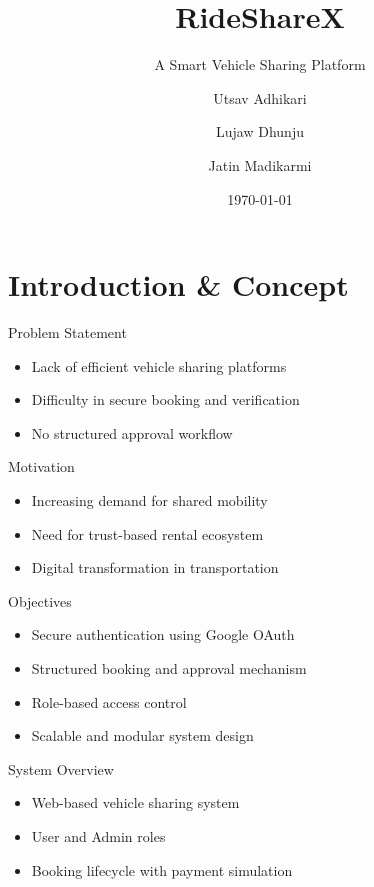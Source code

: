\documentclass[aspectratio=169]{beamer}
\title{RideShareX}
\subtitle{A Smart Vehicle Sharing Platform}
\author{Utsav Adhikari\and Lujaw Dhunju \and Jatin Madikarmi}
\institute{Department of Computer Science}
\date{\today}
\begin{document}
\begin{frame}
    \titlepage
\end{frame}


\section{Introduction \& Concept}

\begin{frame}{Problem Statement}
\begin{itemize}
    \item Lack of efficient vehicle sharing platforms
    \item Difficulty in secure booking and verification
    \item No structured approval workflow
\end{itemize}
\end{frame}

\begin{frame}{Motivation}
\begin{itemize}
    \item Increasing demand for shared mobility
    \item Need for trust-based rental ecosystem
    \item Digital transformation in transportation
\end{itemize}
\end{frame}

\begin{frame}{Objectives}
\begin{itemize}
    \item Secure authentication using Google OAuth
    \item Structured booking and approval mechanism
    \item Role-based access control
    \item Scalable and modular system design
\end{itemize}
\end{frame}

\begin{frame}{System Overview}
\begin{itemize}
    \item Web-based vehicle sharing system
    \item User and Admin roles
    \item Booking lifecycle with payment simulation
\end{itemize}
\end{frame}
\end{document}
